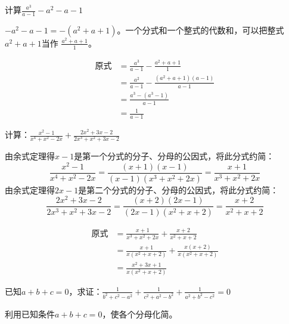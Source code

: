 \begin{example}
    计算$\frac{a^3}{a-1}-a^2-a-1$
\end{example}

\begin{analyze}
    $-a^2-a-1=-(a^2+a+1)$。一个分式和一个整式的代数和，可以把整式$a^2+a+1$当作
    $\frac{a^2+a+1}{1}$。
\end{analyze}

\begin{solution}
    \[\begin{split}
        \text{原式}&=\frac{a^3}{a-1}-\frac{a^2+a+1}{1}   \\
        &=  \frac{a^2}{a-1}-\frac{(a^2+a+1)(a-1)}{a-1}           \\
        &=\frac{a^3-(a^3-1)}{a-1}\\
        &=\frac{1}{a-1}
    \end{split}\]
\end{solution}


\begin{example}
计算：$\frac{x^2-1}{x^4+x^2-2x}+\frac{2x^2+3x-2}{2x^3+x^2+3x-2}$
\end{example}

\begin{analyze}
由余式定理得$x-1$是第一个分式的分子、分母的公因式，将此分式约简：
\[\frac{x^2-1}{x^4+x^2-2x}=\frac{(x+1)(x-1)}{(x-1)(x^3+x^2+2x)}=\frac{x+1}{x^3+x^2+2x}\]
由余式定理得$2x-1$是第二个分式的分子、分母的公因式，将此分式约简：
\[\frac{2x^2+3x-2}{2x^3+x^2+3x-2}=\frac{(x+2)(2x-1)}{(2x-1)(x^2+x+2)}=\frac{x+2}{x^2+x+2}\]
\end{analyze}

\begin{solution}
\[\begin{split}
    \text{原式}&=\frac{x+1}{x^3+x^2+2x}+ \frac{x+2}{x^2+x+2}  \\
    &= \frac{x+1}{x(x^2+x+2)}+ \frac{x(x+2)}{x(x^2+x+2)}   \\
    &=\frac{x^2+3x+1}{x(x^2+x+2)}
\end{split}\] 
\end{solution}

\begin{example}
    已知$a+b+c=0$，求证：$\frac{1}{b^2+c^2-a^2}+\frac{1}{c^2+a^2-b^2}+\frac{1}{a^2+b^2-c^2}=0$
\end{example}

\begin{analyze}
利用已知条件$a+b+c=0$，使各个分母化简。
\end{analyze}

